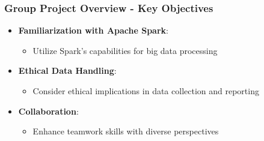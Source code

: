 \documentclass[aspectratio=169]{beamer}
\begin{document}
\begin{frame}[fragile]
    \frametitle{Group Project Overview - Key Objectives}
    \begin{itemize}
        \item \textbf{Familiarization with Apache Spark}:
        \begin{itemize}
            \item Utilize Spark’s capabilities for big data processing
        \end{itemize}
        \item \textbf{Ethical Data Handling}:
        \begin{itemize}
            \item Consider ethical implications in data collection and reporting
        \end{itemize}
        \item \textbf{Collaboration}:
        \begin{itemize}
            \item Enhance teamwork skills with diverse perspectives
        \end{itemize}
    \end{itemize}
\end{frame}
\end{document}
